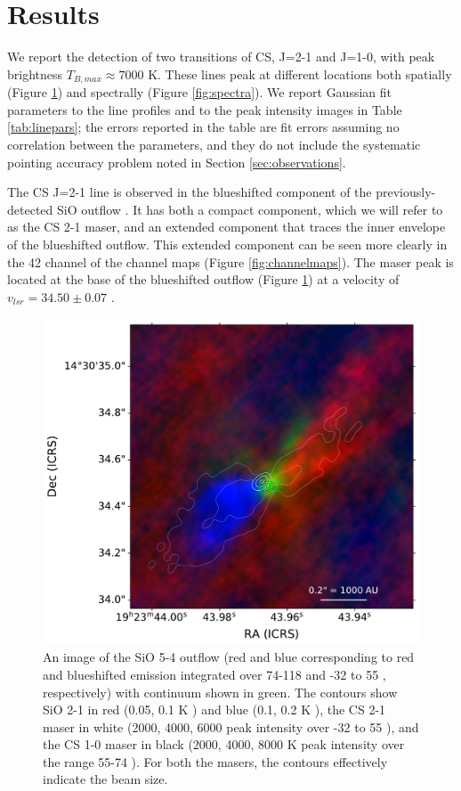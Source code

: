 \documentclass[twocolumn]{aastex62}
\begin{document}
\section{Results}
We report the detection of two transitions of CS, J=2-1 and J=1-0, with
peak brightness $T_{B,max}\approx7000$ K.
These lines peak at different locations both spatially (Figure
\ref{fig:overlay}) and spectrally (Figure \ref{fig:spectra}).
We report Gaussian fit parameters to the line profiles and to the peak intensity
images in Table \ref{tab:linepars}; the errors reported in the table are fit
errors assuming no correlation between the parameters, and they do not include
the systematic pointing accuracy problem noted in Section \ref{sec:observations}.

The CS J=2-1 line is observed in the blueshifted component of the
previously-detected SiO outflow \citep{Goddi2018a}.
It has both a compact component, which we will refer to as the CS 2-1 maser,
and an extended component that traces the inner envelope of the blueshifted
outflow.  This extended component can be seen more clearly in the 42 \kms
channel of the channel maps (Figure \ref{fig:channelmaps}).  The maser
peak is located at the base of the blueshifted outflow (Figure
\ref{fig:overlay}) at a velocity of $v_{lsr}=34.50\pm0.07$ \kms.

\begin{figure}[htp]
    \includegraphics[width=\textwidth]{figures/W51e2e_sio_outflow_with_CS_contours.pdf}
    \caption{An image of the SiO 5-4 outflow (red and blue corresponding to
    red and blueshifted emission integrated over 74-118 \kms and -32 to 55
    \kms, respectively) with continuum shown in green.  The contours show SiO
    2-1 in red (0.05, 0.1 K \kms) and blue (0.1, 0.2 K \kms), the CS 2-1
    maser in white (2000, 4000, 6000 peak intensity over -32 to 55 \kms),
    and the CS 1-0 maser in black (2000, 4000, 8000 K peak intensity over
    the range 55-74 \kms).  For both the masers, the contours effectively
    indicate the beam size.}
    \label{fig:overlay}
\end{figure}
\end{document}
